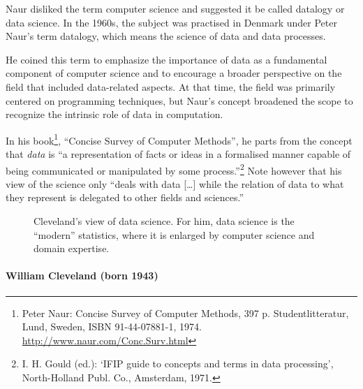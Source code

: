 Naur disliked the term computer science and suggested it be called datalogy or data
science.  In the 1960s, the subject was practised in Denmark under Peter
Naur's term datalogy, which means the science of data and data processes.

He coined this term to emphasize the importance of data as a fundamental component of
computer science and to encourage a broader perspective on the field that included
data-related aspects. At that time, the field was primarily centered on programming
techniques, but Naur's concept broadened the scope to recognize the intrinsic role of data
in computation.

In his book\footnote{Peter Naur: Concise Survey of Computer Methods, 397 p.
Studentlitteratur, Lund, Sweden, ISBN 91-44-07881-1, 1974.
\url{http://www.naur.com/Conc.Surv.html}}, ``Concise Survey of Computer Methods'', he
parts from the concept that \emph{data} is ``a representation of facts or ideas in a
formalised manner capable of being communicated or manipulated by some
process.''\footnote{I. H. Gould (ed.): ‘IFIP guide to concepts and terms in data
processing’, North-Holland Publ. Co., Amsterdam, 1971.} Note however that his view of the
science only ``deals with data [\dots] while the relation of data to what they represent
is delegated to other fields and sciences.''

\def\clevelandds{(0,0) circle (20mm)}
\def\clevelandst{(0:-5mm) circle (15mm)}
\def\clevelandde {(2,1) circle (15mm)}
\def\clevelandcs {(2,-1) circle (15mm)}

\begin{figure}
  \centering
  \caption{
    Cleveland's view of data science.  For him, data science is the ``modern'' statistics,
    where it is enlarged by computer science and domain expertise.
  }
  \label{fig:cleveland}
\end{figure}

\paragraph{William Cleveland (born 1943)}

